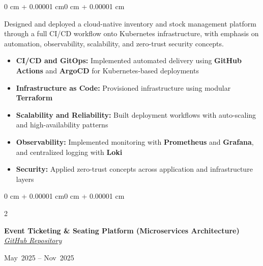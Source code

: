 \documentclass[10pt, letterpaper]{article}
\let\oldhref\href
\renewcommand{\href}[2]{\oldhref{#1}{\textit{\underline{#2}}}}
\newenvironment{highlights}{
    \begin{itemize}[
        topsep=0.10 cm,
        parsep=0.10 cm,
        partopsep=0pt,
        itemsep=0pt,
        leftmargin=0 cm + 10pt
    ]
}{
    \end{itemize}
}
\newenvironment{onecolentry}{
    \begin{adjustwidth}{0 cm + 0.00001 cm}{0 cm + 0.00001 cm}
}{
    \end{adjustwidth}
}
\newenvironment{twocolentry}[2][]{
    \onecolentry
    \def\secondColumn{#2}
    \setcolumnwidth{\fill, 4.5 cm}
    \begin{paracol}{2}
}{
    \switchcolumn \raggedleft \secondColumn
    \end{paracol}
    \endonecolentry
}
\begin{document}
    \begin{onecolentry}
        Designed and deployed a cloud-native inventory and stock management platform through a full CI/CD workflow onto Kubernetes infrastructure, with emphasis on automation, observability, scalability, and zero-trust security concepts.
        \begin{highlights}
            \item \textbf{CI/CD and GitOps:} Implemented automated delivery using \textbf{GitHub Actions} and \textbf{ArgoCD} for Kubernetes-based deployments
            \item \textbf{Infrastructure as Code:} Provisioned infrastructure using modular \textbf{Terraform}
            \item \textbf{Scalability and Reliability:} Built deployment workflows with auto-scaling and high-availability patterns
            \item \textbf{Observability:} Implemented monitoring with \textbf{Prometheus} and \textbf{Grafana}, and centralized logging with \textbf{Loki}
            \item \textbf{Security:} Applied zero-trust concepts across application and infrastructure layers
        \end{highlights}
    \end{onecolentry}

    \vspace{0.10 cm}

    \begin{twocolentry}{
        May~2025 -- Nov~2025
    }
        \textbf{Event Ticketing \& Seating Platform (Microservices Architecture)} \\
        \href{https://github.com/orgs/Evently-Event-Management}{GitHub Repository}
    \end{twocolentry}

    \vspace{0.10 cm}
\end{document}
